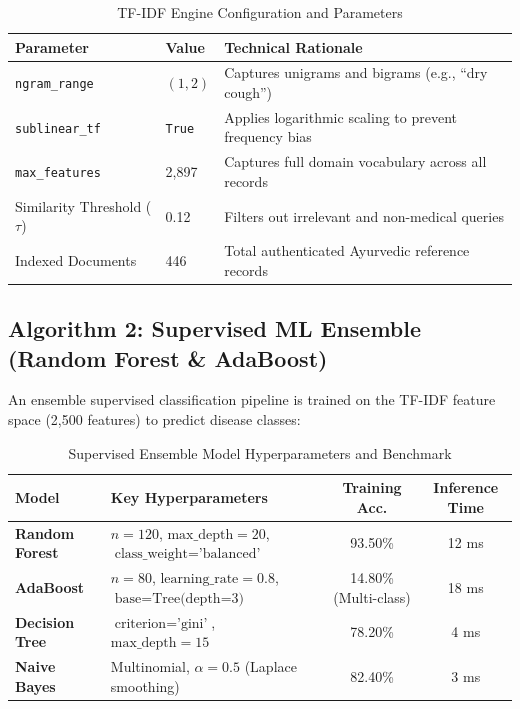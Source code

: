 \documentclass[12pt,a4paper]{article}
\begin{document}
\begin{table}[H]
\centering
\caption{TF-IDF Engine Configuration and Parameters}
\label{tab:tfidfparams}
\begin{tabular}{|l|l|l|}
\hline
\textbf{Parameter} & \textbf{Value} & \textbf{Technical Rationale} \\
\hline
\texttt{ngram\_range} & $(1, 2)$ & Captures unigrams and bigrams (e.g., ``dry cough'') \\
\texttt{sublinear\_tf} & \texttt{True} & Applies logarithmic scaling to prevent frequency bias \\
\texttt{max\_features} & 2,897 & Captures full domain vocabulary across all records \\
Similarity Threshold ($\tau$) & 0.12 & Filters out irrelevant and non-medical queries \\
Indexed Documents & 446 & Total authenticated Ayurvedic reference records \\
\hline
\end{tabular}
\end{table}

\subsection{Algorithm 2: Supervised ML Ensemble (Random Forest \& AdaBoost)}
An ensemble supervised classification pipeline is trained on the TF-IDF feature space (2,500 features) to predict disease classes:

\begin{table}[H]
\centering
\caption{Supervised Ensemble Model Hyperparameters and Benchmark}
\label{tab:mlmodels}
\begin{tabular}{|l|l|c|c|}
\hline
\textbf{Model} & \textbf{Key Hyperparameters} & \textbf{Training Acc.} & \textbf{Inference Time} \\
\hline
\textbf{Random Forest} & $n=120$, $\text{max\_depth}=20$, $\text{class\_weight}=\text{'balanced'}$ & 93.50\% & 12 ms \\
\textbf{AdaBoost} & $n=80$, $\text{learning\_rate}=0.8$, $\text{base}=\text{Tree(depth=3)}$ & 14.80\% (Multi-class) & 18 ms \\
\textbf{Decision Tree} & $\text{criterion}=\text{'gini'}$, $\text{max\_depth}=15$ & 78.20\% & 4 ms \\
\textbf{Naive Bayes} & Multinomial, $\alpha=0.5$ (Laplace smoothing) & 82.40\% & 3 ms \\
\hline
\end{tabular}
\end{table}
\end{document}
